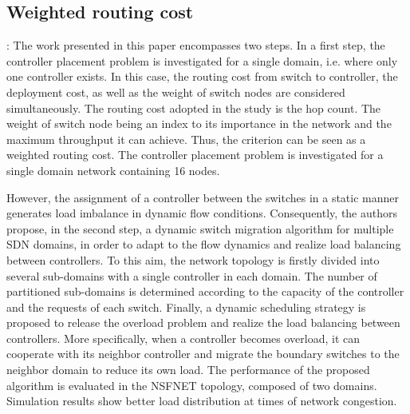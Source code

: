 \documentclass[a4paper,10pt]{article}
\begin{document}




\subsection{Weighted routing cost}

\cite{YaHo15}: The work presented in this paper encompasses two steps. In a first step, the controller placement problem is investigated for a single domain, i.e. where only one controller exists. In this case, the routing cost from switch to controller, the deployment cost, as well as the weight of switch nodes are considered simultaneously. The routing cost adopted in the study is the hop count. The weight of switch node being an index to its importance in the network and the maximum throughput it can achieve. Thus, the criterion can be seen as a weighted routing cost. The controller placement problem is investigated for a single domain network containing 16 nodes.

However, the assignment of a controller between the switches in a static manner generates load imbalance in dynamic flow conditions. Consequently, the authors propose, in the second step, a dynamic switch migration algorithm for multiple SDN domains, in order to adapt to the flow dynamics and realize load balancing between controllers. To this aim, the network topology is firstly divided into several sub-domains with a single controller in each domain. The number of partitioned sub-domains is determined according to the capacity of the controller and the requests of each switch. Finally, a dynamic scheduling strategy is proposed to release the overload problem and realize the load balancing between controllers. More specifically, when a controller becomes overload, it can cooperate with its neighbor controller and migrate the boundary switches to the neighbor domain to reduce its own load. The performance of the proposed algorithm is evaluated in the NSFNET topology, composed of two domains. Simulation results show better load distribution at times of network congestion.

\end{document}
